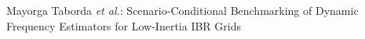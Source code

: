%
{Mayorga Taborda \MakeLowercase{\textit{et al.}}: Scenario-Conditional Benchmarking of Dynamic Frequency Estimators for Low-Inertia IBR Grids}
